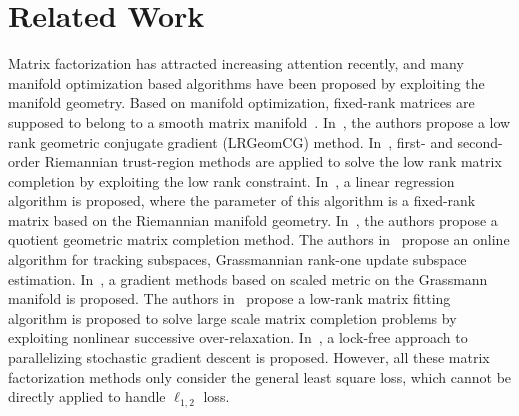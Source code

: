 \documentclass[letterpaper]{article}
\begin{document}



\section{Related Work}

Matrix factorization has attracted increasing attention recently,
and many manifold optimization based algorithms have been proposed by exploiting the manifold geometry.
Based on manifold optimization, fixed-rank matrices are supposed to belong to a smooth matrix manifold~\cite{Absil2008OAMM,vandereycken2013lowrank}.
In~\cite{vandereycken2013lowrank}, the authors propose a low rank geometric conjugate gradient (LRGeomCG) method.
In~\cite{rtrmc2011boumal}, first- and second-order Riemannian trust-region methods are applied to solve the low rank matrix completion by exploiting the low rank constraint.
In~\cite{Bonnabel2011}, a linear regression algorithm is proposed, where the parameter of this algorithm is a fixed-rank matrix based on the Riemannian manifold geometry.
In~\cite{Mishra2012}, the authors propose a quotient geometric matrix completion method.
The authors in~\cite{grouse2010Balzano} propose an online algorithm for tracking subspaces, Grassmannian rank-one update subspace estimation.
In~\cite{ngonips2012scaled}, a gradient methods based on scaled metric on the Grassmann manifold is proposed.
The authors in~\cite{Wen2012} propose a low-rank matrix fitting algorithm is proposed to solve large scale matrix completion problems by exploiting nonlinear successive over-relaxation.
In~\cite{RechtNIPS2011hogwild}, a lock-free approach to parallelizing stochastic gradient descent is proposed.
However, all these matrix factorization methods only consider the general least square loss, which cannot be directly applied to handle $\ell_{1,2}$ loss.
\end{document}
